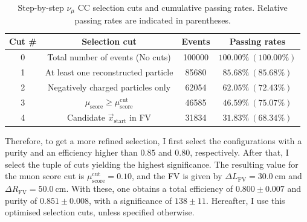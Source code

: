 \begin{table}[h!]
	\caption[Step-by-step $\nu_{\mu}$ CC selection cuts and cumulative passing rates.]{Step-by-step $\nu_{\mu}$ CC selection cuts and cumulative passing rates. Relative passing rates are indicated in parentheses.}
	\begin{center}
		\begin{small}
			\begin{tabular}{c|ccc}
                Cut \# & Selection cut                       & Events & Passing rates          \\[2mm] \hline
                \rule{0pt}{1.1\normalbaselineskip}0      & Total number of events (No cuts)    & 100000 & $100.00\% ~(100.00\%)$ \\[2mm]
                1      & At least one reconstructed particle                              & 85680  & $85.68 \% ~(85.68 \%)$ \\[2mm]
                2      & Negatively charged particles only                                & 62054  & $62.05\% ~(72.43\%)$   \\[2mm]
                3      & $\mu_{\mathrm{score}} \geq \mu_{\mathrm{score}}^{\mathrm{cut}}$  & 46585  & $46.59\% ~(75.07\%)$   \\[2mm]
                4      & Candidate $\vec{x}_{\mathrm{start}}$ in FV                       & 31834  & $31.83\% ~(68.34\%)$  
                \end{tabular}
		\end{small}
	\end{center}
	\label{tab:numuCC_selection}
\end{table}

Therefore, to get a more refined selection, I first select the configurations with a purity and an efficiency higher than $0.85$ and $0.80$, respectively. After that, I select the tuple of cuts yielding the highest significance. The resulting value for the muon score cut is $\mu_{\mathrm{score}}^{\mathrm{cut}} = 0.10$, and the FV is given by $\Delta L_{\mathrm{FV}} = 30.0~\mathrm{cm}$ and $\Delta R_{\mathrm{FV}} = 50.0~\mathrm{cm}$. With these, one obtains a total efficiency of $0.800 \pm 0.007$ and purity of $0.851 \pm 0.008$, with a significance of $138 \pm 11$. Hereafter, I use this optimised selection cuts, unless specified otherwise.

